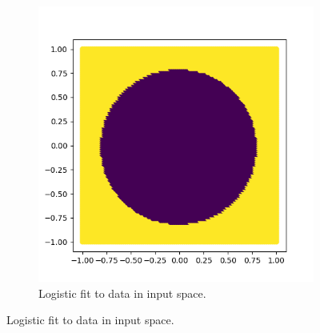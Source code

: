 \documentclass{article}
\theoremstyle{definition}
\theoremstyle{remark}
\theoremstyle{definition}
\begin{document}
\begin{figure}[hbt!]
\begin{subfigure}[b]{0.35\textwidth}
        \includegraphics[width=\textwidth]{Images/logistic/untrans_fit.png}
        \caption{Logistic fit to data in input space. }
        \label{fig:raw_trained}
      \end{subfigure}


\end{figure}
\end{document}

